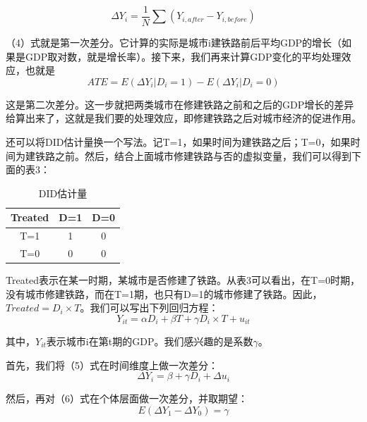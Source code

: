 \documentclass[cn,12pt,math=newtx,citestyle=gb7714-2015,bibstyle=gb7714-2015]{elegantbook}
\begin{document}
	\begin{equation}
		\Delta{Y}_i=\frac{1}{N}\sum{(Y_{i,after}-Y_{i,before})}
	\end{equation}
	
	（4）式就是第一次差分。它计算的实际是城市i建铁路前后平均GDP的增长（如果是GDP取对数，就是增长率）。接下来，我们再来计算GDP变化的平均处理效应，也就是
	\begin{equation}
		ATE=E(\Delta{Y}_i\big|D_i=1)-E(\Delta{Y}_i\big|D_i=0)
	\end{equation}
	
	这是第二次差分。这一步就把两类城市在修建铁路之前和之后的GDP增长的差异给算出来了，这就是我们要的处理效应，即修建铁路之后对城市经济的促进作用。
	
	还可以将DID估计量换一个写法。记T=1，如果时间为建铁路之后；T=0，如果时间为建铁路之前。然后，结合上面城市修建铁路与否的虚拟变量，我们可以得到下面的表3：
	
	\begin{center}
		\begin{table}[!h]
			\caption{DID估计量}\label{tab:digit}
			\begin{center}
				\begin{tabular}{|c|c|c|}
					\hline
					Treated&D=1&D=0\\
					\hline
					T=1&1&0\\
					\hline
					T=0&0&0\\
					\hline
				\end{tabular}
			\end{center}
		\end{table}
	\end{center}
	
	Treated表示在某一时期，某城市是否修建了铁路。从表3可以看出，在T=0时期，没有城市修建铁路，而在T=1期，也只有D=1的城市修建了铁路。因此，$Treated=D_i\times{T}$。我们可以写出下列回归方程：
	\begin{equation}
		Y_{it}=\alpha{D}_i+\beta{T}+\gamma{D_i\times{T}}+u_{it}
	\end{equation}
	
	其中，$Y_{it}$表示城市i在第t期的GDP。我们感兴趣的是系数$\gamma$。
	
	首先，我们将（5）式在时间维度上做一次差分：
	\begin{equation}
		\Delta{Y}_i=\beta+\gamma{D}_i+\Delta{u}_i
	\end{equation}
	
	然后，再对（6）式在个体层面做一次差分，并取期望：
	\begin{equation}
		E(\Delta{Y}_1-\Delta{Y}_0)=\gamma
	\end{equation}
	
\end{document}
